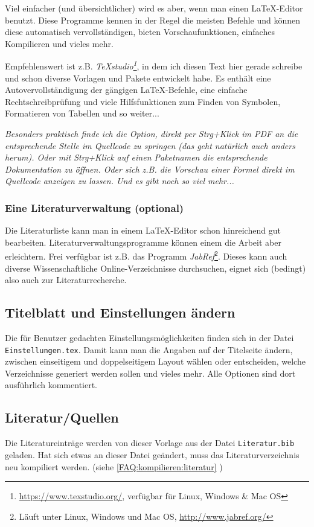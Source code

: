 			Viel einfacher (und übersichtlicher) wird es aber, wenn man einen \LaTeX-Editor benutzt.
			Diese Programme kennen in der Regel die meisten Befehle und können diese automatisch vervollständigen, bieten Vorschaufunktionen, einfaches Kompilieren und vieles mehr.
			
			
			Empfehlenswert ist z.B. \emph{TeXstudio\footnote{\url{https://www.texstudio.org/}, verfügbar für Linux, Windows \& Mac OS}}, in dem ich diesen Text hier gerade schreibe und schon diverse Vorlagen und Pakete entwickelt habe. Es enthält eine Autovervollständigung der gängigen \LaTeX-Befehle, eine einfache Rechtschreibprüfung und viele Hilfsfunktionen zum Finden von Symbolen, Formatieren von Tabellen und so weiter...
			\medskip
			
			\emph{Besonders praktisch finde ich die Option, direkt per Strg+Klick im PDF an die entsprechende Stelle im Quellcode zu springen (das geht natürlich auch anders herum). Oder mit Strg+Klick auf einen Paketnamen die entsprechende Dokumentation zu öffnen. Oder sich z.B. die Vorschau einer Formel direkt im Quellcode anzeigen zu lassen. Und es gibt noch so viel mehr...}
			
			\subsubsection{Eine Literaturverwaltung (optional)}
			Die Literaturliste kann man in einem \LaTeX-Editor schon hinreichend gut bearbeiten.
			Literaturverwaltungsprogramme können einem die Arbeit aber erleichtern.
			Frei verfügbar ist z.B. das Programm \emph{JabRef}\footnote{Läuft unter Linux, Windows und Mac OS, \url{http://www.jabref.org/}}.
			Dieses kann auch diverse Wissenschaftliche Online-Verzeichnisse durchsuchen, eignet sich (bedingt) also auch zur Literaturrecherche.
		
			
		\subsection{Titelblatt und Einstellungen ändern}\label{FAQ:Einstellungen}
			Die für Benutzer gedachten Einstellungsmöglichkeiten finden sich in der Datei \lstinline|Einstellungen.tex|.
%			
			Damit kann man \zb{} die Angaben auf der Titelseite ändern, zwischen einseitigem und doppelseitigem Layout wählen oder entscheiden, welche Verzeichnisse generiert werden sollen und vieles mehr. Alle Optionen sind dort ausführlich kommentiert.
			
		\subsection{Literatur/Quellen}
			Die Literatureinträge werden von dieser Vorlage aus der Datei \lstinline|Literatur.bib| geladen.
			Hat sich etwas an dieser Datei geändert, muss das Literaturverzeichnis neu kompiliert werden. (siehe \ref{FAQ:kompilieren:literatur} \emph{})
			
